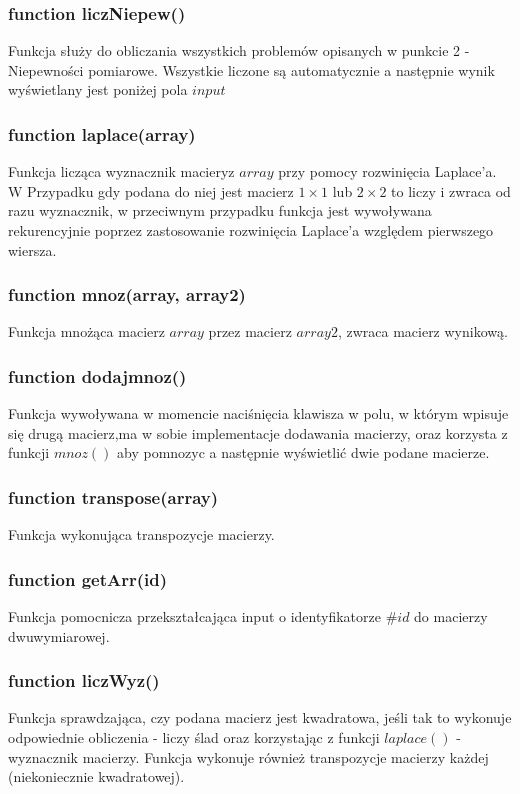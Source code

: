 \documentclass[11pt]{article}
\begin{document}
\subsubsection{function liczNiepew() }
Funkcja służy do obliczania wszystkich problemów opisanych w punkcie 2 - Niepewności pomiarowe. Wszystkie liczone są automatycznie a następnie wynik wyświetlany jest poniżej pola $input$

\subsubsection{function laplace(array) }
Funkcja licząca wyznacznik macieryz $array$ przy pomocy rozwinięcia Laplace'a. W Przypadku gdy podana do niej jest macierz $1 \times 1$ lub $2 \times 2$ to liczy i zwraca od razu wyznacznik, w przeciwnym przypadku funkcja jest wywoływana rekurencyjnie poprzez zastosowanie rozwinięcia Laplace'a względem pierwszego wiersza.

\subsubsection{function mnoz(array, array2) }
Funkcja mnożąca macierz $array$ przez macierz $array2$, zwraca macierz wynikową.

\subsubsection{function dodajmnoz()}
Funkcja wywoływana w momencie naciśnięcia klawisza w polu, w którym wpisuje się drugą macierz,ma w sobie implementacje dodawania macierzy, oraz korzysta z funkcji $mnoz()$ aby pomnozyc a następnie wyświetlić dwie podane macierze.

\subsubsection{function transpose(array) }
Funkcja wykonująca transpozycje macierzy.

\subsubsection{function getArr(id) }
Funkcja pomocnicza przekształcająca input o identyfikatorze $\#id$ do macierzy dwuwymiarowej.

\subsubsection{function liczWyz() }
Funkcja sprawdzająca, czy podana macierz jest kwadratowa, jeśli tak to wykonuje odpowiednie obliczenia - liczy ślad oraz korzystając z funkcji $laplace()$ - wyznacznik macierzy. Funkcja wykonuje również transpozycje macierzy każdej (niekoniecznie kwadratowej).
\end{document}
